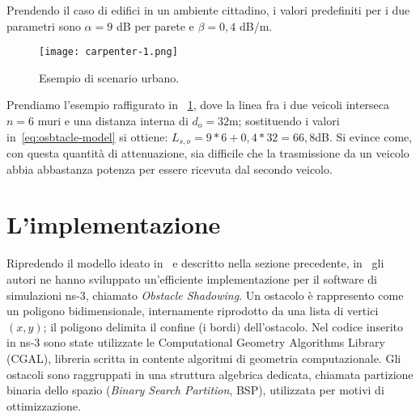 Prendendo il caso di edifici in un ambiente cittadino, i valori predefiniti per i due parametri sono $\alpha = 9$ dB per parete e $\beta = 0,4$ dB/m.
%
\begin{figure}[htbp]
	\centering
		\texttt{[image: carpenter-1.png]}
\caption{Esempio di scenario urbano.\label{fig:scenario-urbano-1}}
\end{figure}
%
Prendiamo l'esempio raffigurato in \figurename~\ref{fig:scenario-urbano-1}, dove la linea fra i due veicoli interseca $n=6$ muri e una distanza interna di $d_o=32$m;
sostituendo i valori in~\ref{eq:osbtacle-model} si ottiene: $L_{s,o} = 9*6 + 0,4*32 = 66,8$dB.
Si evince come, con questa quantità di attenuazione, sia difficile che la trasmissione da un veicolo abbia abbastanza potenza per essere ricevuta dal secondo veicolo.
%
\section{L'implementazione}\label{sec:implementazione}
Ripredendo il modello ideato in~\cite{5720204} e descritto nella sezione precedente, in~\cite{Carpenter:2015:OMI:2756509.2756512} gli autori ne hanno sviluppato
un'efficiente implementazione per il software di simulazioni ns-3, chiamato \textit{Obstacle Shadowing}.
Un ostacolo è rappresento come un poligono bidimensionale, internamente riprodotto da una lista di vertici $(x,y)$; il poligono delimita
il confine (i bordi) dell'ostacolo.
Nel codice inserito in ns-3 sono state utilizzate le Computational Geometry Algorithms Library (CGAL), libreria scritta in \Cpp contente algoritmi di geometria computazionale.
Gli ostacoli sono raggruppati in una struttura algebrica dedicata, chiamata partizione binaria dello spazio (\textit{Binary Search Partition}, BSP), utilizzata
per motivi di ottimizzazione.


